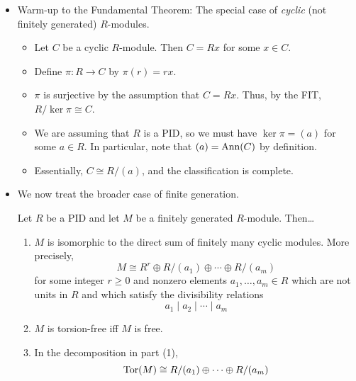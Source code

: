 \documentclass[../notes.tex]{subfiles}
\begin{document}
\begin{itemize}
\begin{theorem}
        \begin{proof}
            Given.
        \end{proof}
    \end{theorem}
    \item Warm-up to the Fundamental Theorem: The special case of \emph{cyclic} (not finitely generated) $R$-modules.
    \begin{itemize}
        \item Let $C$ be a cyclic $R$-module. Then $C=Rx$ for some $x\in C$.
        \item Define $\pi:R\to C$ by $\pi(r)=rx$.
        \item $\pi$ is surjective by the assumption that $C=Rx$. Thus, by the FIT, $R/\ker\pi\cong C$.
        \item We are assuming that $R$ is a PID, so we must have $\ker\pi=(a)$ for some $a\in R$. In particular, note that $(a)=\operatorname{Ann}(C)$ by definition.
        \item Essentially, $C\cong R/(a)$, and the classification is complete.
    \end{itemize}
    \item We now treat the broader case of finite generation.
    \begin{theorem}\label{trm:12.5}
        Let $R$ be a PID and let $M$ be a finitely generated $R$-module. Then\dots
        \begin{enumerate}[ref={\thetheorem(\arabic*)}]
            \item \label{trm:12.5.1}$M$ is isomorphic to the direct sum of finitely many cyclic modules. More precisely,
            \begin{equation*}
                M \cong R^r\oplus R/(a_1)\oplus\cdots\oplus R/(a_m)
            \end{equation*}
            for some integer $r\geq 0$ and nonzero elements $a_1,\dots,a_m\in R$ which are not units in $R$ and which satisfy the divisibility relations
            \begin{equation*}
                a_1\mid a_2\mid\cdots\mid a_m
            \end{equation*}
            \item \label{trm:12.5.2}$M$ is torsion-free iff $M$ is free.
            \item \label{trm:12.5.3}In the decomposition in part (1),
            \begin{equation*}
                \Tor(M) \cong R/(a_1)\oplus\cdots\oplus R/(a_m)

\end{equation*}
\end{enumerate}
\end{theorem}
\end{itemize}
\end{document}

